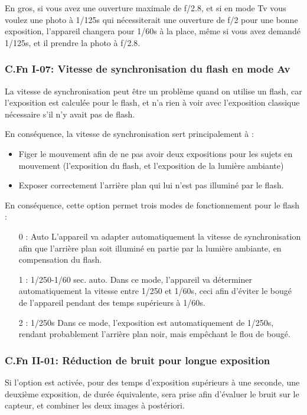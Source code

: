 \documentclass[a4paper,twoside]{article}
\begin{document}
En gros, si vous avez une ouverture maximale de f/2.8, et si en mode Tv vous voulez une photo à 1/125s qui nécessiterait une ouverture de f/2 pour une bonne exposition, l'appareil changera pour 1/60s à la place, même si vous avez demandé 1/125s, et il prendre la photo à f/2.8.

\subsubsection{C.Fn I-07: Vitesse de synchronisation du flash en mode Av}\label{sec:vitesse_synchronisation}
La vitesse de synchronisation peut être un problème quand on utilise un flash, car l'exposition est calculée pour le flash, et n'a rien à voir avec l'exposition classique nécessaire s'il n'y avait pas de flash. 

En conséquence, la vitesse de synchronisation sert principalement à : 
\begin{itemize}
\item Figer le mouvement afin de ne pas avoir deux expositions pour les sujets en mouvement (l'exposition du flash, et l'exposition de la lumière ambiante)
\item Exposer correctement l'arrière plan qui lui n'est pas illuminé par le flash. 
\end{itemize}

En conséquence, cette option permet trois modes de fonctionnement pour le flash :
\begin{itemize}
\item[0 : Auto] L'appareil va adapter automatiquement la vitesse de synchronisation afin que l'arrière plan soit illuminé en partie par la lumière ambiante, en compensation du flash.
\item[1 : 1/250-1/60 sec. auto.] Dans ce mode, l'appareil va déterminer automatiquement la vitesse entre 1/250 et 1/60s, ceci afin d'éviter le bougé de l'appareil pendant des temps supérieurs à 1/60s.
\item[2 : 1/250s] Dans ce mode, l'exposition est automatiquement de 1/250s, rendant probablement l'arrière plan noir, mais empêchant le flou de bougé.
\end{itemize}

\subsubsection{C.Fn II-01: Réduction de bruit pour longue exposition}
Si l'option est activée, pour des temps d'exposition supérieurs à une seconde, une deuxième exposition, de durée équivalente, sera prise afin d'évaluer le bruit sur le capteur, et combiner les deux images à postériori.
\end{document}
